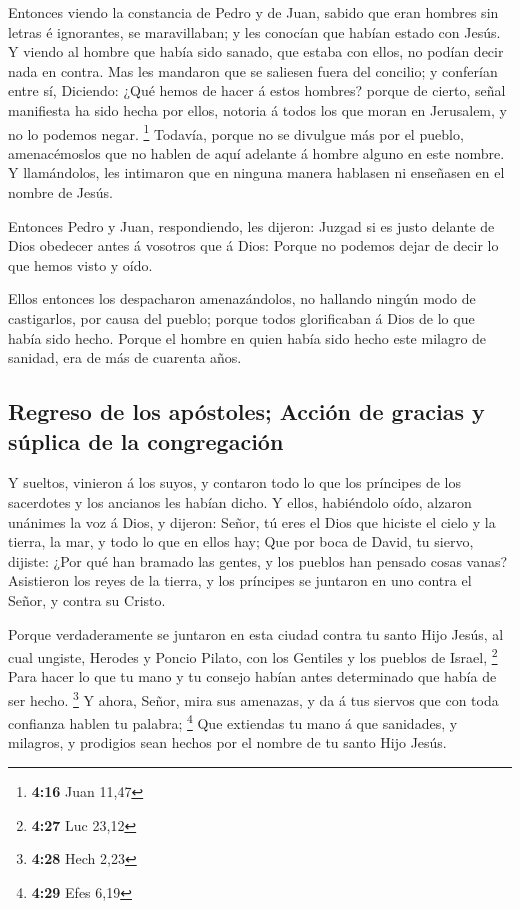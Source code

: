  Entonces viendo la constancia de Pedro y de Juan, sabido
que eran hombres sin letras é ignorantes, se maravillaban; y les
conocían que habían estado con Jesús.  Y viendo al hombre
que había sido sanado, que estaba con ellos, no podían decir nada en
contra.  Mas les mandaron que se saliesen fuera del
concilio; y conferían entre sí,  Diciendo: ¿Qué hemos de
hacer á estos hombres? porque de cierto, señal manifiesta ha sido hecha
por ellos, notoria á todos los que moran en Jerusalem, y no lo podemos
negar. \footnote{\textbf{4:16} Juan 11,47}  Todavía, porque
no se divulgue más por el pueblo, amenacémoslos que no hablen de aquí
adelante á hombre alguno en este nombre.  Y llamándolos,
les intimaron que en ninguna manera hablasen ni enseñasen en el nombre
de Jesús.

 Entonces Pedro y Juan, respondiendo, les dijeron: Juzgad
si es justo delante de Dios obedecer antes á vosotros que á Dios:
 Porque no podemos dejar de decir lo que hemos visto y
oído.

 Ellos entonces los despacharon amenazándolos, no hallando
ningún modo de castigarlos, por causa del pueblo; porque todos
glorificaban á Dios de lo que había sido hecho.  Porque el
hombre en quien había sido hecho este milagro de sanidad, era de más de
cuarenta años.

\hypertarget{regreso-de-los-apuxf3stoles-acciuxf3n-de-gracias-y-suxfaplica-de-la-congregaciuxf3n}{%
\subsection{Regreso de los apóstoles; Acción de gracias y súplica de la
congregación}\label{regreso-de-los-apuxf3stoles-acciuxf3n-de-gracias-y-suxfaplica-de-la-congregaciuxf3n}}

 Y sueltos, vinieron á los suyos, y contaron todo lo que
los príncipes de los sacerdotes y los ancianos les habían dicho.
 Y ellos, habiéndolo oído, alzaron unánimes la voz á Dios,
y dijeron: Señor, tú eres el Dios que hiciste el cielo y la tierra, la
mar, y todo lo que en ellos hay;  Que por boca de David, tu
siervo, dijiste: ¿Por qué han bramado las gentes, y los pueblos han
pensado cosas vanas?  Asistieron los reyes de la tierra, y
los príncipes se juntaron en uno contra el Señor, y contra su Cristo.

 Porque verdaderamente se juntaron en esta ciudad contra tu
santo Hijo Jesús, al cual ungiste, Herodes y Poncio Pilato, con los
Gentiles y los pueblos de Israel, \footnote{\textbf{4:27} Luc 23,12}
 Para hacer lo que tu mano y tu consejo habían antes
determinado que había de ser hecho. \footnote{\textbf{4:28} Hech 2,23}
 Y ahora, Señor, mira sus amenazas, y da á tus siervos que
con toda confianza hablen tu palabra; \footnote{\textbf{4:29} Efes 6,19}
 Que extiendas tu mano á que sanidades, y milagros, y
prodigios sean hechos por el nombre de tu santo Hijo Jesús.

